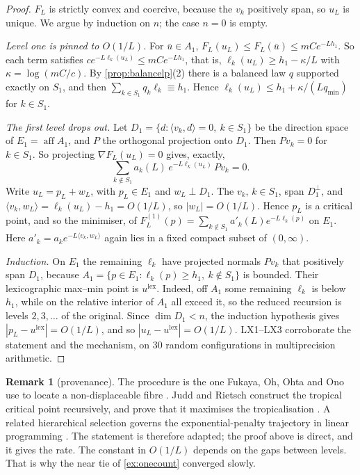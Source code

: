 \documentclass[11pt]{article}
\theoremstyle{definition}\newtheorem{definition}[theorem]{Definition}\newtheorem{remark}[theorem]{Remark}\newtheorem{example}[theorem]{Example}\newtheorem{problem}[theorem]{Open problem}\crefname{problem}{Problem}{Problems}
\begin{document}
\begin{proof}
$F_L$ is strictly convex and coercive, because the $v_k$ positively span, so $u_L$ is unique. We argue by induction on $n$; the case $n=0$ is empty.

\emph{Level one is pinned to $O(1/L)$.} For $\bar u\in A_1$, $F_L(u_L)\le F_L(\bar u)\le mCe^{-Lh_1}$. So each term satisfies $ce^{-L\ell_k(u_L)}\le mCe^{-Lh_1}$, that is, $\ell_k(u_L)\ge h_1-\kappa/L$ with $\kappa=\log(mC/c)$. By
\cref{prop:balancelp}(2) there is a balanced law $q$ supported exactly on $S_1$, and then $\sum_{k\in S_1}q_k\ell_k\equiv h_1$. Hence $\ell_k(u_L)\le h_1+\kappa/(Lq_{\min})$ for $k\in S_1$.

\emph{The first level drops out.} Let $D_1=\{d:\langle v_k,d\rangle=0,\ k\in S_1\}$ be the direction space of $E_1=\operatorname{aff}A_1$, and $P$ the orthogonal projection onto $D_1$. Then $Pv_k=0$ for $k\in S_1$. So
projecting $\nabla F_L(u_L)=0$ gives, exactly,
\[
\sum_{k\notin S_1}a_k(L)\,e^{-L\ell_k(u_L)}\,Pv_k=0 .
\]
Write $u_L=p_L+w_L$, with $p_L\in E_1$ and $w_L\perp D_1$. The $v_k$, $k\in S_1$, span $D_1^\perp$, and $\langle v_k,w_L\rangle=\ell_k(u_L)-h_1=O(1/L)$, so $|w_L|=O(1/L)$. Hence $p_L$ is a critical point, and so the
minimiser, of $F^{(1)}_L(p)=\sum_{k\notin S_1}a'_k(L)e^{-L\ell_k(p)}$ on $E_1$. Here $a'_k=a_ke^{-L\langle v_k,w_L\rangle}$ again lies in a fixed compact subset of $(0,\infty)$.

\emph{Induction.} On $E_1$ the remaining $\ell_k$ have projected normals $Pv_k$ that positively span $D_1$, because $A_1=\{p\in E_1:\ell_k(p)\ge h_1,\ k\notin S_1\}$ is bounded. Their lexicographic max--min
point is $u^{\mathrm{lex}}$. Indeed, off $A_1$ some remaining $\ell_k$ is below $h_1$, while on the relative interior of $A_1$ all exceed it, so the reduced recursion is levels $2,3,\dots$ of the original.
Since $\dim D_1<n$, the induction hypothesis gives $|p_L-u^{\mathrm{lex}}|=O(1/L)$, and so $|u_L-u^{\mathrm{lex}}|=O(1/L)$.
LX1--LX3 corroborate the statement and the mechanism, on $30$ random configurations in multiprecision arithmetic.
\end{proof}

\begin{remark}[provenance]
The procedure is the one Fukaya, Oh, Ohta and Ono use to locate a non-displaceable fibre \cite{FOOO2010}. Judd and Rietsch construct the tropical critical point
recursively, and prove that it maximises the tropicalisation \cite{JuddRietsch2019}. A related hierarchical selection governs the exponential-penalty trajectory in linear
programming \cite{CominettiSanMartin1994}. The statement is therefore adapted; the proof above is direct, and it gives the rate. The constant in $O(1/L)$ depends on the gaps between levels. That is
why the near tie of \cref{ex:onecount} converged slowly.
\end{remark}
\end{document}

